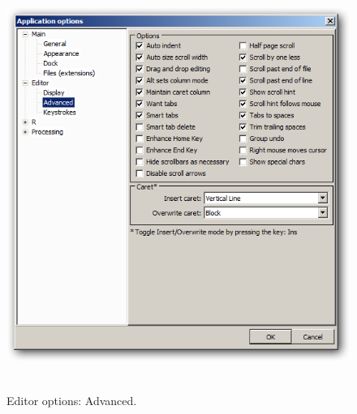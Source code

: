 \begin{figure}[h!]
  \includegraphics[scale=0.50]{./res/app_editor_advanced.png}~~
  \caption{Editor options: Advanced.}
  \label{fig:editor_advanced}
\end{figure}

